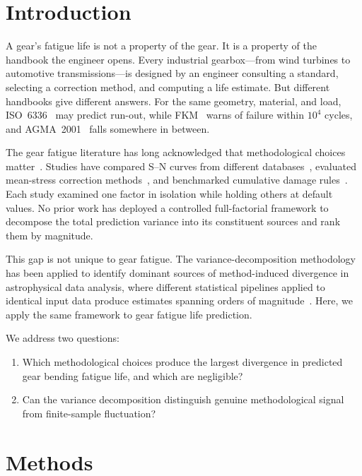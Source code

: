 \documentclass[12pt,a4paper]{article}
\begin{document}
\section{Introduction}
\label{sec:intro}

A gear's fatigue life is not a property of the gear. It is a property
of the handbook the engineer opens. Every industrial gearbox---from wind
turbines to automotive transmissions---is designed by an engineer
consulting a standard, selecting a correction method, and computing a
life estimate. But different handbooks give different answers. For the
same geometry, material, and load, ISO~6336~\cite{iso6336} may predict
run-out, while FKM~\cite{fkm} warns of failure within $10^4$ cycles, and
AGMA~2001~\cite{agma2001} falls somewhere in between.

The gear fatigue literature has long acknowledged that methodological
choices matter~\cite{stephens2001, dowling2013}. Studies have compared
S--N curves from different databases~\cite{matweb}, evaluated mean-stress
correction methods~\cite{dowling2009}, and benchmarked cumulative damage
rules~\cite{fatemi1998}. Each study examined one factor in
isolation while holding others at default values. No prior work has
deployed a controlled full-factorial framework to decompose the total
prediction variance into its constituent sources and rank them by
magnitude.

This gap is not unique to gear fatigue. The variance-decomposition
methodology has been applied to identify dominant sources of
method-induced divergence in astrophysical data analysis, where
different statistical pipelines applied to identical input data produce
estimates spanning orders of magnitude~\cite{chen2026etaearth}. Here,
we apply the same framework to gear fatigue life prediction.

We address two questions:
\begin{enumerate}
  \item Which methodological choices produce the largest divergence in
        predicted gear bending fatigue life, and which are negligible?
  \item Can the variance decomposition distinguish genuine
        methodological signal from finite-sample fluctuation?
\end{enumerate}

\section{Methods}
\label{sec:methods}
\end{document}
